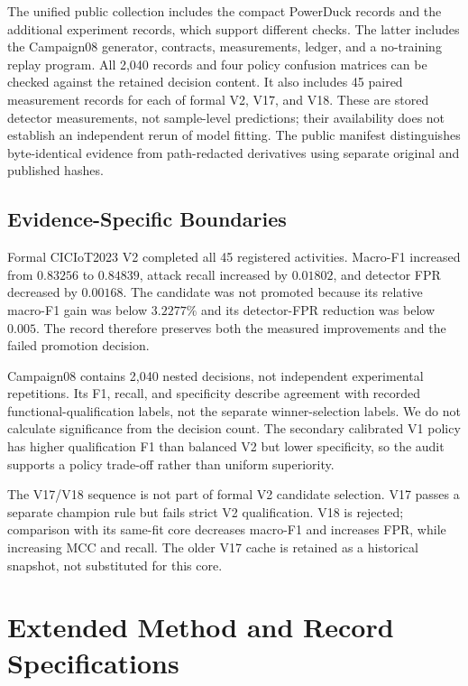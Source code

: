 \documentclass[manuscript,screen,nonacm]{acmart}
\begin{document}
The unified public collection includes the compact PowerDuck records and
the additional experiment records, which support different checks.
The latter includes the Campaign08 generator, contracts, measurements,
ledger, and a no-training replay program. All 2,040 records
and four policy confusion matrices can be checked against the retained
decision content. It also includes 45 paired measurement records for each
of formal V2, V17, and V18. These are stored detector measurements, not
sample-level predictions; their availability does not establish an
independent rerun of model fitting. The public manifest distinguishes
byte-identical evidence from path-redacted derivatives using separate
original and published hashes.

\subsection{Evidence-Specific Boundaries}

Formal CICIoT2023 V2 completed all 45 registered activities. Macro-F1
increased from $0.83256$ to $0.84839$, attack recall increased by $0.01802$,
and detector FPR decreased by $0.00168$. The candidate was not promoted
because its relative macro-F1 gain was below $3.2277\%$ and its
detector-FPR reduction was below $0.005$. The record therefore preserves
both the measured improvements and the failed promotion decision.

Campaign08 contains 2,040 nested decisions, not independent experimental
repetitions. Its F1, recall, and specificity describe agreement with
recorded functional-qualification labels, not the separate winner-selection labels.
We do not calculate significance from the decision count.
The secondary calibrated V1 policy has higher qualification F1 than balanced
V2 but lower specificity, so the audit supports a policy trade-off rather
than uniform superiority.

The V17/V18 sequence is not part of formal V2 candidate selection.
V17 passes a separate champion rule but fails strict V2 qualification.
V18 is rejected; comparison with its same-fit core decreases macro-F1
and increases FPR, while increasing MCC and recall. The older V17 cache
is retained as a historical snapshot, not substituted for this core.


\section{Extended Method and Record Specifications}
\label{app:method-details}
\end{document}
